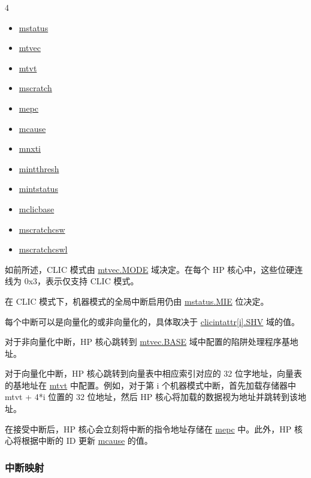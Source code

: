 \documentclass[main\_\_CN.tex]{subfiles}
\begin{document}
\begin{multicols}{4}
\begin{itemize}
\item \hyperref[regdesc:MSTATUS]{mstatus}
\item \hyperref[regdesc:MTVEC]{mtvec}
\item \hyperref[regdesc:MTVT]{mtvt}
\item \hyperref[regdesc:MSCRATCH]{mscratch}
\item \hyperref[regdesc:MEPC]{mepc}
\item \hyperref[regdesc:MCAUSE]{mcause}
\item \hyperref[regdesc:MNXTI_REG]{mnxti}
\item \hyperref[regdesc:MINTTHRESH]{mintthresh}
\item \hyperref[regdesc:MINTSTATUS]{mintstatus}
\item \hyperref[regdesc:MCLICBASE_REG]{mclicbase}
\item \hyperref[regdesc:MSCRATCHCSW_REG]{mscratchcsw}
\item \hyperref[regdesc:MSCRATCHCSWL_REG]{mscratchcswl}
\end{itemize}
\end{multicols}


如前所述，CLIC 模式由 \hyperref[fielddesc:MTVECMODE]{mtvec.MODE} 域决定。在每个 HP 核心中，这些位硬连线为 0x3，表示仅支持 CLIC 模式。

在 CLIC 模式下，机器模式的全局中断启用仍由 \hyperref[fielddesc:MSTATUSMIE]{mstatus.MIE} 位决定。

每个中断可以是向量化的或非向量化的，具体取决于 \hyperref[fielddesc:MCLICINTATTR_i_SHV]{clicintattr[i].SHV} 域的值。

对于非向量化中断，HP 核心跳转到 \hyperref[fielddesc:MTVECBASE]{mtvec.BASE} 域中配置的陷阱处理程序基地址。

对于向量化中断，HP 核心跳转到向量表中相应索引对应的 32 位字地址，向量表的基地址在 \hyperref[regdesc:MTVT]{mtvt} 中配置。例如，对于第 i 个机器模式中断，首先加载存储器中 mtvt + 4*i 位置的 32 位地址，然后 HP 核心将加载的数据视为地址并跳转到该地址。

在接受中断后，HP 核心会立刻将中断的指令地址存储在 \hyperref[regdesc:MEPC]{mepc} 中。此外，HP 核心将根据中断的 ID 更新 \hyperref[regdesc:MCAUSE]{mcause} 的值。

\hypertarget{riscvcpu-clic-intmap}{}
\subsubsection{中断映射}
\label{sec:riscvcpu-clic-intmap}
\end{document}
